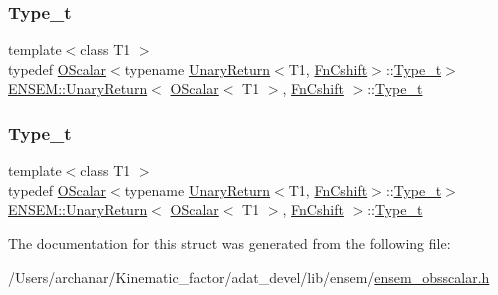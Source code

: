 \subsubsection{\texorpdfstring{Type\_t}{Type\_t}\hspace{0.1cm}{\footnotesize\ttfamily [1/2]}}
{\footnotesize\ttfamily template$<$class T1 $>$ \\
typedef \mbox{\hyperlink{classENSEM_1_1OScalar}{O\+Scalar}}$<$typename \mbox{\hyperlink{structENSEM_1_1UnaryReturn}{Unary\+Return}}$<$T1, \mbox{\hyperlink{structENSEM_1_1FnCshift}{Fn\+Cshift}}$>$\+::\mbox{\hyperlink{structENSEM_1_1UnaryReturn_3_01OScalar_3_01T1_01_4_00_01FnCshift_01_4_a98d26d4e3352558b80bc62389e24a27d}{Type\+\_\+t}}$>$ \mbox{\hyperlink{structENSEM_1_1UnaryReturn}{E\+N\+S\+E\+M\+::\+Unary\+Return}}$<$ \mbox{\hyperlink{classENSEM_1_1OScalar}{O\+Scalar}}$<$ T1 $>$, \mbox{\hyperlink{structENSEM_1_1FnCshift}{Fn\+Cshift}} $>$\+::\mbox{\hyperlink{structENSEM_1_1UnaryReturn_3_01OScalar_3_01T1_01_4_00_01FnCshift_01_4_a98d26d4e3352558b80bc62389e24a27d}{Type\+\_\+t}}}

\mbox{\label{structENSEM_1_1UnaryReturn_3_01OScalar_3_01T1_01_4_00_01FnCshift_01_4_a98d26d4e3352558b80bc62389e24a27d}} 
\subsubsection{\texorpdfstring{Type\_t}{Type\_t}\hspace{0.1cm}{\footnotesize\ttfamily [2/2]}}
{\footnotesize\ttfamily template$<$class T1 $>$ \\
typedef \mbox{\hyperlink{classENSEM_1_1OScalar}{O\+Scalar}}$<$typename \mbox{\hyperlink{structENSEM_1_1UnaryReturn}{Unary\+Return}}$<$T1, \mbox{\hyperlink{structENSEM_1_1FnCshift}{Fn\+Cshift}}$>$\+::\mbox{\hyperlink{structENSEM_1_1UnaryReturn_3_01OScalar_3_01T1_01_4_00_01FnCshift_01_4_a98d26d4e3352558b80bc62389e24a27d}{Type\+\_\+t}}$>$ \mbox{\hyperlink{structENSEM_1_1UnaryReturn}{E\+N\+S\+E\+M\+::\+Unary\+Return}}$<$ \mbox{\hyperlink{classENSEM_1_1OScalar}{O\+Scalar}}$<$ T1 $>$, \mbox{\hyperlink{structENSEM_1_1FnCshift}{Fn\+Cshift}} $>$\+::\mbox{\hyperlink{structENSEM_1_1UnaryReturn_3_01OScalar_3_01T1_01_4_00_01FnCshift_01_4_a98d26d4e3352558b80bc62389e24a27d}{Type\+\_\+t}}}



The documentation for this struct was generated from the following file\+:\begin{DoxyCompactItemize}
\item 
/\+Users/archanar/\+Kinematic\+\_\+factor/adat\+\_\+devel/lib/ensem/\mbox{\hyperlink{lib_2ensem_2ensem__obsscalar_8h}{ensem\+\_\+obsscalar.\+h}}\end{DoxyCompactItemize}
